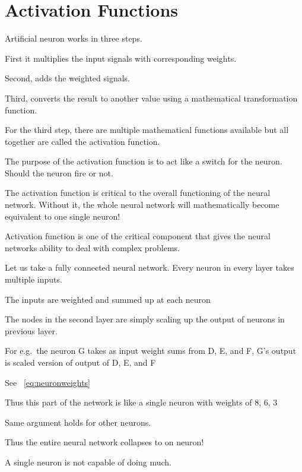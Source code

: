 	\section{Activation Functions}

	\begin{bulletedlist}
		\item Artificial neuron works in three steps.
		\begin{numberedlist}
			\item First it multiplies the input signals with corresponding weights.
			\item Second, adds the weighted signals.
			\item Third, converts the result to another value using a mathematical transformation function.
		\end{numberedlist}
		\item For the third step, there are multiple mathematical functions available but all together are called the activation function.
		\item The purpose of the activation function is to act like a switch for the neuron. Should the neuron fire or not.
		\item The activation function is critical to the overall functioning of the neural network. Without it, the whole neural network will mathematically become equivalent to one single neuron!
		\item Activation function is one of the critical component that gives the neural networks ability to deal with complex problems.
		\item Let us take a fully connected neural network. Every neuron in every layer takes multiple inputs.
		\item The inputs are weighted and summed up at each neuron
		\item The nodes in the second layer are simply scaling up the output of neurons in previous layer.
		\item For e.g.\ the neuron G takes as input weight sums from D, E, and F, G's output is scaled version of output of D, E, and F
		\item See \equationname~\ref{eq:neuronweights}
		\item Thus this part of the network is like a single neuron with weights of 8, 6, 3
		\item Same argument holds for other neurons.
		\item Thus the entire neural network collapses to on neuron!
		\item A single neuron is not capable of doing much.
	\end{bulletedlist}


